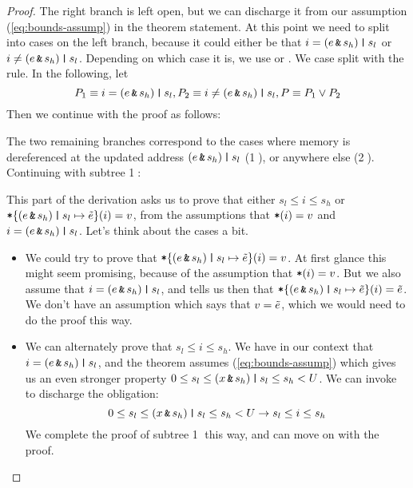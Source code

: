 \documentclass[11pt,twoside]{scrartcl}
\begin{document}
\begin{proof}
The right branch is left open, but we can discharge it from our assumption (\ref{eq:bounds-assump}) in the theorem statement.
At this point we need to split into cases on the left branch, because it could either be that $i = (e \operatorname{\texttt{\upshape \&}} s_h) \operatorname{\texttt{\upshape |}} s_l$ or $i \ne (e \operatorname{\texttt{\upshape \&}} s_h) \operatorname{\texttt{\upshape |}} s_l$. Depending on which case it is, we use  or . We case split with the  rule. In the following, let
\[
P_1 \equiv i = (e \operatorname{\texttt{\upshape \&}} s_h) \operatorname{\texttt{\upshape |}} s_l, P_2 \equiv i \ne(e \operatorname{\texttt{\upshape \&}} s_h) \operatorname{\texttt{\upshape |}} s_l, P \equiv P_1 \lor P_2
\]
Then we continue with the proof as follows:
\begin{sequentdeduction}
 {
}
\end{sequentdeduction}
The two remaining branches correspond to the cases where memory is dereferenced at the updated address $(e \operatorname{\texttt{\upshape \&}} s_h) \operatorname{\texttt{\upshape |}} s_l$ (\textcircled{1}), or anywhere else (\textcircled{2}).
Continuing with subtree \textcircled{1}:
\begin{sequentdeduction}
 {
}
\end{sequentdeduction}
This part of the derivation asks us to prove that either $s_l \le i \le s_h$ or $\texttt{\upshape *}\{(e \operatorname{\texttt{\upshape \&}} s_h) \operatorname{\texttt{\upshape |}} s_l\mapsto\tilde{e}\}(i)=v$, from the assumptions that $\texttt{\upshape *}(i)=v$ and $i = (e \operatorname{\texttt{\upshape \&}} s_h) \operatorname{\texttt{\upshape |}} s_l$. Let's think about the cases a bit.
\begin{itemize}
\item We could try to prove that $\texttt{\upshape *}\{(e \operatorname{\texttt{\upshape \&}} s_h) \operatorname{\texttt{\upshape |}} s_l\mapsto\tilde{e}\}(i)=v$. At first glance this might seem promising, because of the assumption that $\texttt{\upshape *}(i)=v$. But we also assume that $i = (e \operatorname{\texttt{\upshape \&}} s_h) \operatorname{\texttt{\upshape |}} s_l$, and  tells us then that $\texttt{\upshape *}\{(e \operatorname{\texttt{\upshape \&}} s_h) \operatorname{\texttt{\upshape |}} s_l\mapsto\tilde{e}\}(i) = \tilde{e}$. We don't have an assumption which says that $v = \tilde{e}$, which we would need to do the proof this way.
\item We can alternately prove that $s_l \le i \le s_h$. We have in our context that $i = (e \operatorname{\texttt{\upshape \&}} s_h) \operatorname{\texttt{\upshape |}} s_l$, and the theorem assumes (\ref{eq:bounds-assump}) which gives us an even stronger property $0 \le s_l \le  (x \operatorname{\texttt{\upshape \&}} s_h) \operatorname{\texttt{\upshape |}} s_l \le s_h < U$. We can invoke  to discharge the obligation:
\[
0 \le s_l \le  (x \operatorname{\texttt{\upshape \&}} s_h) \operatorname{\texttt{\upshape |}} s_l \le s_h < U \rightarrow s_l \le i \le s_h
\]
We complete the proof of subtree \textcircled{1} this way, and can move on with the proof.
\end{itemize}


\end{proof}
\end{document}
